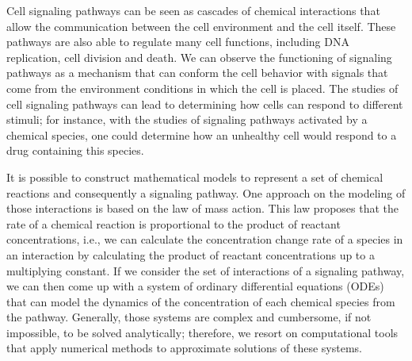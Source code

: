 




Cell signaling pathways can be seen as cascades of chemical interactions 
that allow the communication between the cell environment and the 
cell itself. These pathways are also able to regulate many cell 
functions, including DNA replication, cell division and death. We
can observe the functioning of signaling pathways as a mechanism that 
can conform the cell behavior with signals that come from the 
environment conditions in which the cell is placed. The studies of cell 
signaling pathways can lead to determining how cells can respond to 
different stimuli; for instance, with the studies of signaling pathways
activated by a chemical species, one could determine how an unhealthy 
cell would respond to a drug containing this species.

It is possible to construct mathematical models to represent a set of
chemical reactions and consequently a signaling pathway. One approach on 
the modeling of those interactions is based on the law of mass action. 
This law proposes that the rate of a chemical reaction is proportional 
to the product of reactant concentrations, i.e., we can calculate the 
concentration change rate of a species in an interaction by calculating 
the product of reactant concentrations up to a multiplying constant. 
If we consider the set of interactions of a signaling pathway, we can
then come up with a system of ordinary differential equations (ODEs) 
that can model the dynamics of the concentration of each chemical 
species from the pathway. Generally, those systems are complex and 
cumbersome, if not impossible, to be solved analytically; therefore, we 
resort on computational tools that apply numerical methods to 
approximate solutions of these systems.


